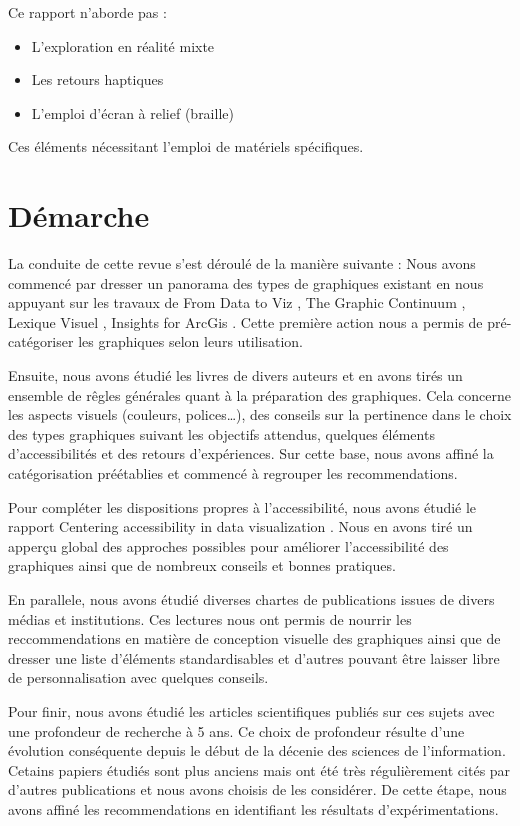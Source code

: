 \documentclass[11pt]{article}
\begin{document}
Ce rapport n'aborde pas :
\begin{itemize}
\item L'exploration en réalité mixte
\item Les retours haptiques
\item L'emploi d'écran à relief (braille)
\end{itemize}
Ces éléments nécessitant l'emploi de matériels spécifiques.
\section{Démarche}
\label{sec:orgd69da69}
La conduite de cette revue s'est déroulé de la manière suivante :
Nous avons commencé par dresser un panorama des types de graphiques existant en nous appuyant sur les travaux de \og From Data to Viz\fg{} \autocite{yanholtzDataViz2018}, \og The Graphic Continuum\fg{} \autocite{jonathanschwabishGraphicContinuum2014}, \og Lexique Visuel\fg{} \autocite{alansmithLexiqueVisuel}, \og Insights for ArcGis\fg{} \autocite{lindabealeInsightsArcGIS2017}.
Cette première action nous a permis de pré-catégoriser les graphiques selon leurs utilisation.

Ensuite, nous avons étudié les livres de divers auteurs et en avons tirés un ensemble de rêgles générales quant à la préparation des graphiques. Cela concerne les aspects visuels (couleurs, polices\ldots{}), des conseils sur la pertinence dans le choix des types graphiques suivant les objectifs attendus, quelques éléments d'accessibilités et des retours d'expériences. Sur cette base, nous avons affiné la catégorisation préétablies et commencé à regrouper les recommendations.

Pour compléter les dispositions propres à l'accessibilité, nous avons étudié le rapport \og Centering accessibility in data visualization\fg{} \autocite{schwabishCenteringAccessibilityData2022}. Nous en avons tiré un apperçu global des approches possibles pour améliorer l'accessibilité des graphiques ainsi que de nombreux conseils et bonnes pratiques.

En parallele, nous avons étudié diverses chartes de publications issues de divers médias et institutions. Ces lectures nous ont permis de nourrir les reccommendations en matière de conception visuelle des graphiques ainsi que de dresser une liste d'éléments standardisables et d'autres pouvant être laisser libre de personnalisation avec quelques conseils.

Pour finir, nous avons étudié les articles scientifiques publiés sur ces sujets avec une profondeur de recherche à 5 ans. Ce choix de profondeur résulte d'une évolution conséquente depuis le début de la décenie des sciences de l'information. Cetains papiers étudiés sont plus anciens mais ont été très régulièrement cités par d'autres publications et nous avons choisis de les considérer. De cette étape, nous avons affiné les recommendations en identifiant les résultats d'expérimentations.
\end{document}

